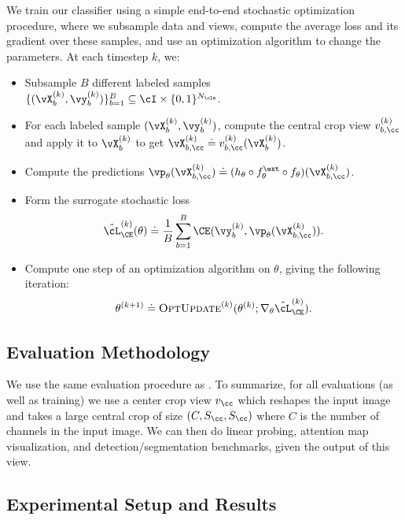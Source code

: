 \documentclass[../../book-main.tex]{subfiles}
\begin{document}
We train our classifier using a simple end-to-end stochastic
optimization procedure, where we subsample data and views, compute
the average loss and its gradient over these samples, and use an
optimization algorithm to change the parameters. At each timestep \(k\), we:
\begin{itemize}
\item Subsample \(B\) different labeled samples \(\{(\vX_{b}^{(k)},
    \vy_{b}^{(k)})\}_{b = 1}^{B} \subseteq \cI \times \{0, 1\}^{N_{\cls}}\).
\item For each labeled sample \((\vX_{b}^{(k)}, \vy_{b}^{(k)})\),
    compute the central crop view \(v_{b, \cc}^{(k)}\) and apply it
    to \(\vX_{b}^{(k)}\) to get \(\vX_{b, \cc}^{(k)} \doteq v_{b,
    \cc}^{(k)}(\vX_{b}^{(k)})\).
\item Compute the predictions \(\vp_{\theta}(\vX_{b, \cc}^{(k)})
        \doteq (h_{\theta} \circ f_{\theta}^{\ext} \circ
    f_{\theta})(\vX_{b, \cc}^{(k)})\).
\item Form the surrogate stochastic loss
    \begin{equation}
        \hat{\cL}_{\CE}^{(k)}(\theta) \doteq \frac{1}{B}\sum_{b =
        1}^{B}\CE(\vy_{b}^{(k)}, \vp_{\theta}(\vX_{b, \cc}^{(k)})) .
    \end{equation}
\item Compute one step of an optimization algorithm on \(\theta\),
    giving the following iteration:
    \begin{equation}
        \theta^{(k + 1)} \doteq
        \textsc{OptUpdate}^{(k)}(\theta^{(k)};
        \nabla_{\theta}\hat{\cL}_{\CE}^{(k)}) .
    \end{equation}
\end{itemize}

\subsection{Evaluation Methodology} \label{sub:image_classification_evals}

We use the same evaluation procedure as
. To summarize, for all
evaluations (as well as training) we use a center crop view
\(v_{\cc}\) which reshapes the input image and takes a large central
crop of size \((C, S_{\cc}, S_{\cc})\) where \(C\) is the number of
channels in the input image. We can then do linear probing, attention
map visualization, and detection/segmentation benchmarks, given the
output of this view.

\subsection{Experimental Setup and Results}\label{sub:image_classification_experiments}
\end{document}
